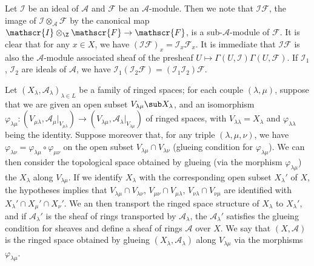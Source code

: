 Let $\mathscr{I}$ be an ideal of $\mathscr{A}$ and $\mathscr{F}$ be an $\mathscr{A}$-module. Then we note that $\mathscr{I}\mathscr{F}$, the image of $\mathscr{I}\otimes_{\mathscr{A}}\mathscr{F}$ by the canonical map $\mathscr{I}\otimes_{\Z}\mathscr{F}\to\mathscr{F}$, is a sub-$\mathscr{A}$-module of $\mathscr{F}$. It is clear that for any $x\in X$, we have $(\mathscr{I}\mathscr{F})_x=\mathscr{I}_x\mathscr{F}_x$. It is immediate that $\mathscr{I}\mathscr{F}$ is also the $\mathscr{A}$-module associated sheaf of the presheaf $U\mapsto\Gamma(U,\mathscr{I})\Gamma(U,\mathscr{F})$. If $\mathscr{I}_1$, $\mathscr{I}_2$ are ideals of $\mathscr{A}$, we have $\mathscr{I}_1(\mathscr{I}_2\mathscr{F})=(\mathscr{I}_1\mathscr{I}_2)\mathscr{F}$.\par
Let $(X_\lambda,\mathscr{A}_\lambda)_{\lambda\in L}$ be a family of ringed spaces; for each couple $(\lambda,\mu)$, suppose that we are given an open subset $V_{\lambda\mu}\sub X_\lambda$, and an isomorphism $\varphi_{\lambda\mu}:(V_{\mu\lambda},\mathscr{A}_\mu|_{V_{\mu\lambda}})\to(V_{\lambda\mu},\mathscr{A}_{\lambda}|_{V_{\lambda\mu}})$ of ringed spaces, with $V_{\lambda\lambda}=X_\lambda$ and $\varphi_{\lambda\lambda}$ being the identity. Suppose moreover that, for any triple $(\lambda,\mu,\nu)$, we have $\varphi_{\lambda\nu}=\varphi_{\lambda\mu}\circ\varphi_{\mu\nu}$ on the open subset $V_{\lambda\mu}\cap V_{\lambda\nu}$ (glueing condition for $\varphi_{\lambda\mu}$). We can then consider the topological space obtained by glueing (via the morphism $\varphi_{\lambda\mu}$) the $X_\lambda$ along $V_{\lambda\mu}$. If we identify $X_\lambda$ with the corresponding open subset $X_\lambda'$ of $X$, the hypotheses implies that $V_{\lambda\mu}\cap V_{\lambda\nu}$, $V_{\mu\nu}\cap V_{\mu\lambda}$, $V_{\nu\lambda}\cap V_{\nu\mu}$ are identified with $X_\lambda'\cap X_\mu'\cap X_\nu'$. We an then transport the ringed space structure of $X_\lambda$ to $X_\lambda'$, and if $\mathscr{A}_\lambda'$ is the sheaf of rings transported by $\mathscr{A}_\lambda$, the $\mathscr{A}_\lambda'$ satisfies the glueing condition for sheaves and define a sheaf of rings $\mathscr{A}$ over $X$. We say that $(X,\mathscr{A})$ is the ringed space obtained by glueing $(X_\lambda,\mathscr{A}_\lambda)$ along $V_{\lambda\mu}$ via the morphisms $\varphi_{\lambda\mu}$.\par

